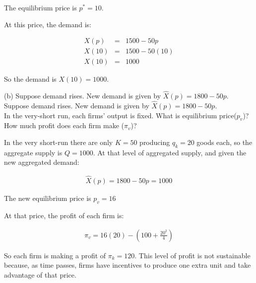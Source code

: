 \begin{myanswerbox}
    The equilibrium price is \( p^* = 10 \).
\end{myanswerbox}

At this price, the demand is:

\begin{eqnarray*}
X(p) &=& 1500 - 50p\\
X(10) &=& 1500 - 50(10)\\
X(10) &=& 1000
\end{eqnarray*}

\begin{myanswerbox}
  So the demand is \( X(10) = 1000 \).
\end{myanswerbox}


\begin{tcolorbox}
    (b) Suppose demand rises. New demand is given by \( \hat{X}(p) = 1800 - 50p \). Suppose demand rises. New demand is given by \( \hat{X}(p) = 1800 - 50p \).\\
    
    In the very-short run, each firms' output is fixed. What is equilibrium price(\( p_v \))? How much profit does each firm make (\( \pi_v \))?
\end{tcolorbox}

In the very short-run there are only \( K = 50 \) producing \( q_k = 20 \) goods each, so the aggregate supply is \( Q = 1000 \).
At that level of aggregated supply, and given the new aggregated demand:

\begin{eqnarray*}
\hat{X}(p) = 1800 - 50p = 1000 
\end{eqnarray*}

\begin{myanswerbox}
    The new equilibrium price is \( p_v = 16 \)
\end{myanswerbox}

At that price, the profit of each firm is:

\begin{eqnarray*}
\pi_v = 16(20) - \left(100 + \frac{20^2}{4}\right)
\end{eqnarray*}

\begin{myanswerbox}
So each firm is making a profit of \( \pi_k = 120 \). This level of profit is not sustainable because, as time passes, firms have incentives to produce one extra unit and take advantage of that price.
\end{myanswerbox}


